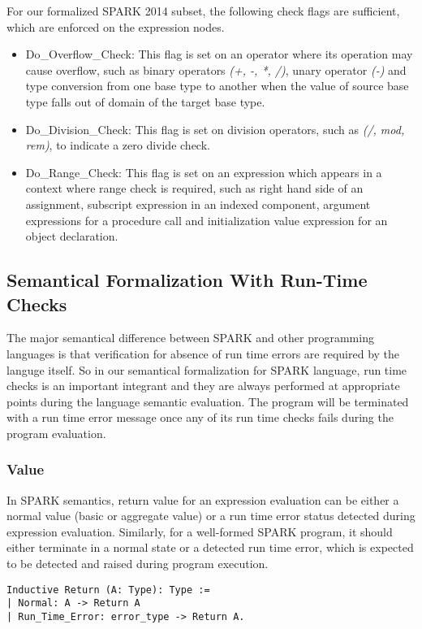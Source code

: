 For our formalized SPARK 2014 subset, the following check flags are sufficient,
which are enforced on the expression nodes.
\begin{itemize}
\item 
  Do\_Overflow\_Check: This flag is set on an operator where its operation may
  cause overflow, such as binary operators \textit{(+, -, *, /)}, unary operator
  \textit{(-)} and type conversion from one base type to another when the value
  of source base type falls out of domain of the target base type.
\item 
  Do\_Division\_Check: This flag is set on division operators, such as
  \textit{(/, mod, rem)}, to indicate a zero divide check.
\item 
  Do\_Range\_Check: This flag is set on an expression which appears in a
  context where range check is required, such as right hand side of an
  assignment, subscript expression in an indexed component, argument expressions
  for a procedure call and initialization value expression for an object
  declaration.
\end{itemize}

\subsection{Semantical Formalization With Run-Time Checks}
The major semantical difference between SPARK and other programming languages is
that verification for absence of run time errors are required by the languge
itself.
So in our semantical formalization for SPARK language, run time checks is an
important integrant and they are always performed at appropriate points during
the language semantic evaluation. The program will be terminated with a run time
error message once any of its run time checks fails during the program
evaluation.

\subsubsection{Value}
In SPARK semantics, return value for an expression evaluation can be either
a normal value (basic or aggregate value) or a run time error status detected
during expression evaluation.
Similarly, for a well-formed SPARK program, it should either terminate in a
normal state or a detected run time error, which is expected to be detected and
raised during program execution.

\begin{lstlisting}[escapechar=\#, language=coq]
Inductive Return (A: Type): Type :=
| Normal: A -> Return A
| Run_Time_Error: error_type -> Return A.
\end{lstlisting}

